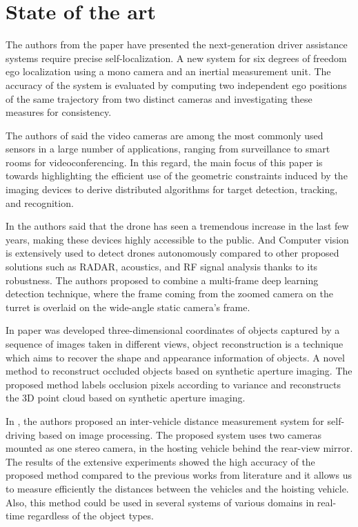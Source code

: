 \chapter{State of the art} \label{capitulo2}

The authors from the paper \cite{Lategahn2013} have presented the next-generation driver assistance systems require precise self-localization. A new system for six degrees of freedom ego localization using a mono camera and an inertial measurement unit. The accuracy of the system is evaluated by computing two independent ego positions of the same trajectory from two distinct cameras and investigating these measures for consistency.

The authors of  \cite{Sankaranarayanan2008} said the video cameras are among the most commonly used sensors in a large number of applications, ranging from surveillance to smart rooms for videoconferencing. In this regard, the main focus of this paper is towards highlighting the efficient use of the geometric constraints induced by the imaging devices to derive distributed algorithms for target detection, tracking, and recognition.


In \cite{Unlu2019} the authors said that the drone has seen a tremendous increase in the last few years, making these devices highly accessible to the public. And Computer vision is extensively used to detect drones autonomously compared to other proposed solutions such as RADAR, acoustics, and RF signal analysis thanks to its robustness. The authors proposed to combine a multi-frame deep learning detection technique, where the frame coming from the zoomed camera on the turret is overlaid on the wide-angle static camera’s frame.


In paper \cite{Pei2019} was developed three-dimensional coordinates of objects captured by a sequence of images taken in different views, object reconstruction is a technique which aims to recover the shape and appearance information of objects.  A novel method to reconstruct occluded objects based on synthetic aperture imaging. The proposed method labels occlusion pixels according to variance and reconstructs the 3D point cloud based on synthetic aperture imaging.


In \cite{Zaarane2020}, the authors proposed an inter-vehicle distance measurement system for self-driving based on image processing. The proposed system uses two cameras mounted as one stereo camera, in the hosting vehicle behind the rear-view mirror. The results of the extensive experiments showed the high accuracy of the proposed method compared to the previous works from literature and it allows us to measure efficiently the distances between the vehicles and the hoisting vehicle. Also, this method could be used in several systems of various domains in real-time regardless of the object types.

